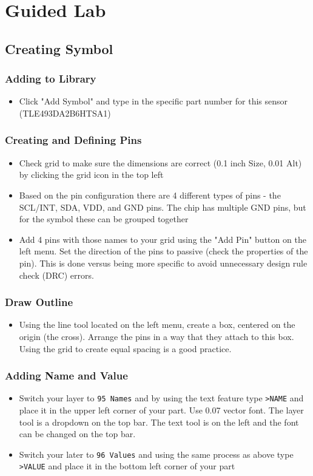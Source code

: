 \documentclass{article}
\begin{document}
\section{Guided Lab}
\subsection{Creating Symbol}
\subsubsection{Adding to Library}
\begin{itemize}
    \item Click "Add Symbol" and type in the specific part number for this sensor (TLE493DA2B6HTSA1)
\end{itemize}
\subsubsection{Creating and Defining Pins}
\begin{itemize}
    \item Check grid to make sure the dimensions are correct (0.1 inch Size, 0.01 Alt) by clicking the grid icon in the top left
    \item Based on the pin configuration there are 4 different types of pins - the SCL/INT, SDA, VDD, and GND pins. The chip has multiple GND pins, but for the symbol these can be grouped together
    \item Add 4 pins with those names to your grid using the "Add Pin" button on the left menu. Set the direction of the pins to passive (check the properties of the pin). This is done versus being more specific to avoid unnecessary design rule check (DRC) errors.
\end{itemize}
\subsubsection{Draw Outline}
\begin{itemize}
    \item Using the line tool located on the left menu, create a box, centered on the origin (the cross). Arrange the pins in a way that they attach to this box. Using the grid to create equal spacing is a good practice. 
\end{itemize}
\subsubsection{Adding Name and Value}
\begin{itemize}
    \item Switch your layer to \texttt{95 Names} and by using the text feature type \texttt{>NAME} and place it in the upper left corner of your part. Use 0.07 vector font. The layer tool is a dropdown on the top bar. The text tool is on the left and the font can be changed on the top bar.
    \item Switch your later to \texttt{96 Values} and using the same process as above type \texttt{>VALUE} and place it in the bottom left corner of your part
\end{itemize}
\end{document}
